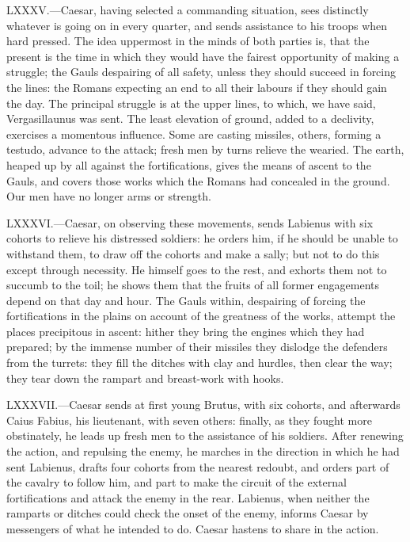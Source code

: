LXXXV.—Caesar, having selected a commanding situation, sees distinctly
whatever is going on in every quarter, and sends assistance to his
troops when hard pressed. The idea uppermost in the minds of both
parties is, that the present is the time in which they would have the
fairest opportunity of making a struggle; the Gauls despairing of all
safety, unless they should succeed in forcing the lines: the Romans
expecting an end to all their labours if they should gain the day. The
principal struggle is at the upper lines, to which, we have said,
Vergasillaunus was sent. The least elevation of ground, added to a
declivity, exercises a momentous influence. Some are casting missiles,
others, forming a testudo, advance to the attack; fresh men by turns
relieve the wearied. The earth, heaped up by all against the
fortifications, gives the means of ascent to the Gauls, and covers those
works which the Romans had concealed in the ground. Our men have no
longer arms or strength.

LXXXVI.—Caesar, on observing these movements, sends Labienus with six
cohorts to relieve his distressed soldiers: he orders him, if he should
be unable to withstand them, to draw off the cohorts and make a sally;
but not to do this except through necessity. He himself goes to the
rest, and exhorts them not to succumb to the toil; he shows them that
the fruits of all former engagements depend on that day and hour. The
Gauls within, despairing of forcing the fortifications in the plains on
account of the greatness of the works, attempt the places precipitous in
ascent: hither they bring the engines which they had prepared; by the
immense number of their missiles they dislodge the defenders from the
turrets: they fill the ditches with clay and hurdles, then clear the
way; they tear down the rampart and breast-work with hooks.

LXXXVII.—Caesar sends at first young Brutus, with six cohorts, and
afterwards Caius Fabius, his lieutenant, with seven others: finally, as
they fought more obstinately, he leads up fresh men to the assistance of
his soldiers. After renewing the action, and repulsing the enemy, he
marches in the direction in which he had sent Labienus, drafts four
cohorts from the nearest redoubt, and orders part of the cavalry to
follow him, and part to make the circuit of the external fortifications
and attack the enemy in the rear. Labienus, when neither the ramparts or
ditches could check the onset of the enemy, informs Caesar by messengers
of what he intended to do. Caesar hastens to share in the action.

